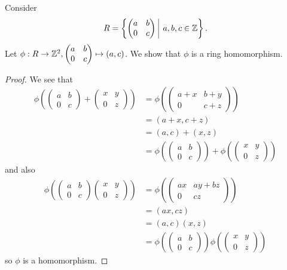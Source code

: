 \begin{example}
    Consider
    \[
        R = \left\{\begin{pmatrix}a&b\\0&c\end{pmatrix}\vert a,b,c\in\Z\right\}.
    \]
    Let $\phi: R \to \mathbb{Z}^2, \begin{pmatrix}a&b\\0&c\end{pmatrix} \mapsto (a,c)$. We show that $\phi$ is a ring homomorphism.

    \begin{proof}
        We see that
        \begin{align*}
            \phi\left(\begin{pmatrix}a&b\\0&c\end{pmatrix} + \begin{pmatrix}x&y\\0&z\end{pmatrix}\right) &= \phi\left(\begin{pmatrix}a+x&b+y\\0&c+z\end{pmatrix}\right)\\
            &= (a+x,c+z)\\
            &= (a,c) + (x,z)\\
            &= \phi\left(\begin{pmatrix}a&b\\0&c\end{pmatrix}\right) + \phi\left(\begin{pmatrix}x&y\\0&z\end{pmatrix}\right)
        \end{align*}
        and also
        \begin{align*}
            \phi\left(\begin{pmatrix}a&b\\0&c\end{pmatrix}\begin{pmatrix}x&y\\0&z\end{pmatrix}\right) &= \phi\left(\begin{pmatrix}ax&ay+bz\\0&cz\end{pmatrix}\right)\\
            &= (ax, cz)\\
            &= (a,c)(x,z)\\
            &= \phi\left(\begin{pmatrix}a&b\\0&c\end{pmatrix}\right)\phi\left(\begin{pmatrix}x&y\\0&z\end{pmatrix}\right)
        \end{align*}
        so $\phi$ is a homomorphism.
    \end{proof}
\end{example}

